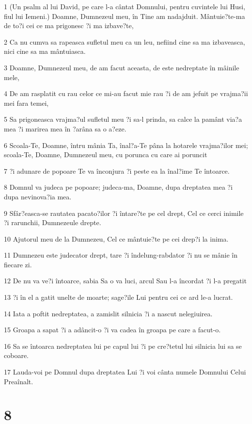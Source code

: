 \par 1 (Un psalm al lui David, pe care l-a cântat Domnului, pentru cuvintele lui Husi, fiul lui Iemeni.) Doamne, Dumnezeul meu, în Tine am nadajduit. Mântuie?te-ma de to?i cei ce ma prigonesc ?i ma izbave?te,
\par 2 Ca nu cumva sa rapeasca sufletul meu ca un leu, nefiind cine sa ma izbaveasca, nici cine sa ma mântuiasca.
\par 3 Doamne, Dumnezeul meu, de am facut aceasta, de este nedreptate în mâinile mele,
\par 4 De am rasplatit cu rau celor ce mi-au facut mie rau ?i de am jefuit pe vrajma?ii mei fara temei,
\par 5 Sa prigoneasca vrajma?ul sufletul meu ?i sa-l prinda, sa calce la pamânt via?a mea ?i marirea mea în ?arâna sa o a?eze.
\par 6 Scoala-Te, Doamne, întru mânia Ta, înal?a-Te pâna la hotarele vrajma?ilor mei; scoala-Te, Doamne, Dumnezeul meu, cu porunca cu care ai poruncit
\par 7 ?i adunare de popoare Te va înconjura ?i peste ea la înal?ime Te întoarce.
\par 8 Domnul va judeca pe popoare; judeca-ma, Doamne, dupa dreptatea mea ?i dupa nevinova?ia mea.
\par 9 Sfâr?easca-se rautatea pacato?ilor ?i întare?te pe cel drept, Cel ce cerci inimile ?i rarunchii, Dumnezeule drepte.
\par 10 Ajutorul meu de la Dumnezeu, Cel ce mântuie?te pe cei drep?i la inima.
\par 11 Dumnezeu este judecator drept, tare ?i îndelung-rabdator ?i nu se mânie în fiecare zi.
\par 12 De nu va ve?i întoarce, sabia Sa o va luci, arcul Sau l-a încordat ?i l-a pregatit
\par 13 ?i în el a gatit unelte de moarte; sage?ile Lui pentru cei ce ard le-a lucrat.
\par 14 Iata a poftit nedreptatea, a zamislit silnicia ?i a nascut nelegiuirea.
\par 15 Groapa a sapat ?i a adâncit-o ?i va cadea în groapa pe care a facut-o.
\par 16 Sa se întoarca nedreptatea lui pe capul lui ?i pe cre?tetul lui silnicia lui sa se coboare.
\par 17 Lauda-voi pe Domnul dupa dreptatea Lui ?i voi cânta numele Domnului Celui Preaînalt.

\chapter{8}

